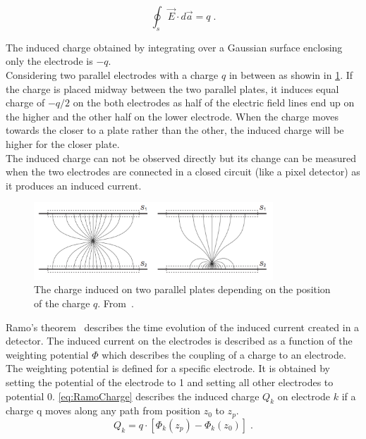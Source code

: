 \begin{equation}
\oint_{s} \vec{E} \cdot d\vec{a}=q\; .
\label{eq:GaussLaw}
\end{equation}

The induced charge obtained by integrating over a Gaussian surface
enclosing only the electrode is $-q$. \\
Considering two parallel electrodes with a charge $q$ in between as
showin in \cref{fig:InducedCharge_parallelPlates}. If the charge
is placed midway between the two parallel plates, it induces equal
charge of $-q/2$ on the both electrodes as half of the electric field
lines end up on the higher and the other half on the lower
electrode. When the charge moves towards the closer to a plate rather
than the other, the induced charge will be higher for the closer
plate. \\
The induced charge can not be observed directly but its change can be
measured when the two electrodes are connected in a closed circuit
(like a pixel detector) as it produces an induced current.

\begin{figure}[htbp]
  \centering
  \includegraphics[width=0.8\textwidth]{figures/Ramo/InducedCharge_parallelPlates.png}
  \caption{The charge induced on two parallel plates depending on the
    position of the charge $q$. From~\cite{Spieler2005}.}
  \label{fig:InducedCharge_parallelPlates}
\end{figure}

Ramo's theorem~\cite{Ramo:1939vr} describes the time evolution of the induced current
created in a detector. The induced current on the electrodes is
described as a function of the weighting potential $\Phi$ which
describes the coupling of a charge to an electrode. \\
The weighting potential is defined for a specific electrode. It is
obtained by setting the potential of the electrode to 1 and setting
all other electrodes to potential 0. \cref{eq:RamoCharge}
describes the induced charge $Q_k$ on electrode $k$ if a charge q moves along
any path from position $z_0$ to $z_p$.
\begin{equation}
    Q_{k}=q \cdot [\Phi_k(z_p)-\Phi_k(z_0)] \; .
   \label{eq:RamoCharge} 
  \end{equation}

